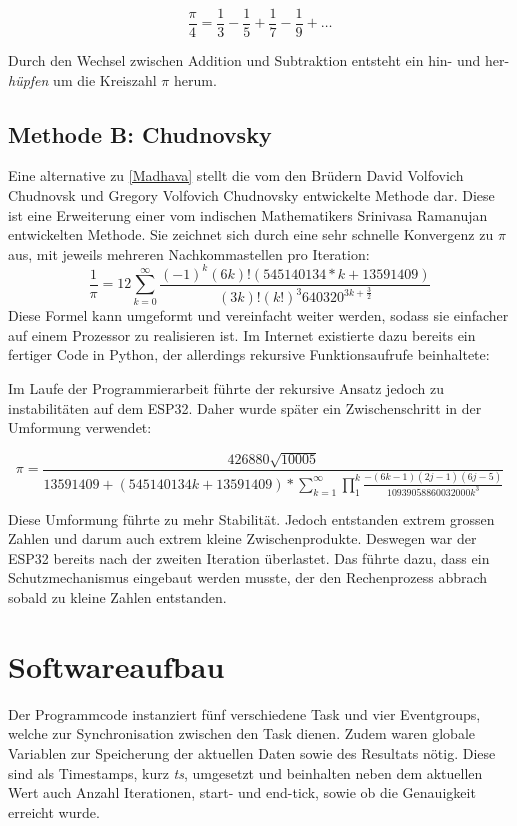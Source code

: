 \documentclass[ngerman,10pt,a4paper,titlepage]{report}
\begin{document}
	\begin{equation}\label{Madhava}
		\frac{\pi}{4} = \frac{1}{3} - \frac{1}{5} + \frac{1}{7} - \frac{1}{9} + \dots
	\end{equation}
	
	Durch den Wechsel zwischen Addition und Subtraktion entsteht ein hin- und her-\textit{\textacutedbl hüpfen\textacutedbl} um die Kreiszahl $\pi$ herum.
	
	\section{Methode B: Chudnovsky}\label{MethodeB}
	Eine alternative zu \ref{Madhava} stellt die vom den Brüdern David Volfovich Chudnovsk und Gregory Volfovich Chudnovsky entwickelte Methode dar. Diese ist eine Erweiterung einer vom indischen Mathematikers Srinivasa Ramanujan entwickelten Methode. Sie zeichnet sich durch eine sehr schnelle Konvergenz zu $\pi$ aus, mit jeweils mehreren Nachkommastellen pro Iteration:
	\begin{equation}\label{Chudnovsky}
		\frac{1}{\pi} = 12 \sum_{k=0}^\infty \frac{(-1)^{k}(6k)!(545140134 * k + 13591409)}{(3k)!(k!)^{3}640320^{3k + \frac{3}{2}}}
	\end{equation}
	Diese Formel kann umgeformt und vereinfacht weiter werden, sodass sie einfacher auf einem Prozessor zu realisieren ist. Im Internet existierte dazu bereits ein fertiger Code in Python, der allerdings rekursive Funktionsaufrufe beinhaltete:
	
	
	
	Im Laufe der Programmierarbeit führte der rekursive Ansatz jedoch zu instabilitäten auf dem ESP32. Daher wurde später ein Zwischenschritt in der Umformung verwendet:
	
	\begin{equation}\label{Chudnovsky_easy}
		\pi = \frac{426880 \sqrt{10005}}{13591409 + (545140134k + 13591409)*\sum_{k=1}^\infty \prod_{1}^{k}\frac{-(6k-1)(2j-1)(6j-5)}{10939058860032000k^{3}}}
	\end{equation}
	
	Diese Umformung führte zu mehr Stabilität. Jedoch entstanden extrem grossen Zahlen und darum auch extrem kleine Zwischenprodukte. Deswegen war der ESP32 bereits nach der zweiten Iteration überlastet. Das führte dazu, dass ein Schutzmechanismus eingebaut werden musste, der den Rechenprozess abbrach sobald zu kleine Zahlen entstanden.
	
	\chapter{Softwareaufbau}
	Der Programmcode instanziert fünf verschiedene Task und vier Eventgroups, welche zur Synchronisation zwischen den Task dienen. Zudem waren globale Variablen zur Speicherung der aktuellen Daten sowie des Resultats nötig. Diese sind als Timestamps, kurz \textit{ts}, umgesetzt und beinhalten neben dem aktuellen Wert auch Anzahl Iterationen, start- und end-tick, sowie ob die Genauigkeit erreicht wurde.
\end{document}
